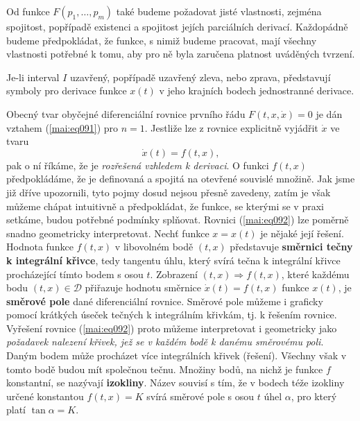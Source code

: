   \begin{mdframed}[style=mdnote]     
    Od funkce \(F(p_1, \ldots, p_m)\) také budeme požadovat jisté vlastnosti, zejména spojitost,
    popřípadě existenci a spojitost jejích parciálních derivací. Každopádně budeme předpokládat, že
    funkce, s nimiž budeme pracovat, mají všechny vlastnosti potřebné k tomu, aby pro ně byla
    zaručena platnost uváděných tvrzení.
  \end{mdframed}

  \begin{mdframed}[style=mdnote]     
    Je-li interval \(I\) uzavřený, popřípadě uzavřený zleva, nebo zprava, představují symboly pro
    derivace funkce \(x(t)\) v jeho krajních bodech jednostranné derivace.
  \end{mdframed}
        
    Obecný tvar obyčejné diferenciální rovnice prvního řádu \(F(t, x, \dot{x}) = 0\) je dán vztahem
    (\ref{mai:eq091}) pro \(n = 1\). Jestliže lze z rovnice explicitně vyjádřit \(\dot{x}\) ve tvaru
    \begin{equation}\label{mai:eq092}
      \dot{x}(t) = f(t, x),
    \end{equation}
    pak o ní říkáme, že je \emph{rozřešená vzhledem k derivaci}. O funkci \(f(t, x)\) předpokládáme,
    že je definovaná a spojitá na otevřené souvislé množině. Jak jsme již dříve upozornili, tyto
    pojmy dosud nejsou přesně zavedeny, zatím je však můžeme chápat intuitivně a předpokládat, že
    funkce, se kterými se v praxi setkáme, budou potřebné podmínky splňovat. Rovnici
    (\ref{mai:eq092}) lze poměrně snadno geometricky interpretovat. Nechť funkce \(x = x(t)\) je
    nějaké její řešení. Hodnota funkce \(f(t, x)\) v libovolném bodě \((t, x)\) představuje
    \textbf{směrnici tečny k integrální křivce}, tedy tangentu úhlu, který svírá tečna k integrální
    křivce procházející tímto bodem s osou \(t\). Zobrazení \((t, x) \Rightarrow f(t, x)\), které
    každému bodu \((t, x) \in \mathcal{D}\) přiřazuje hodnotu směrnice \(\dot{x}(t) = f(t, x)\)
    funkce \(x(t)\), je \textbf{směrové pole} dané diferenciální rovnice. Směrové pole můžeme i
    graficky  pomocí krátkých úseček tečných k integrálním křivkám, tj. k řešením
    rovnice. Vyřešení rovnice (\ref{mai:eq092}) proto můžeme interpretovat i geometricky jako
    \emph{požadavek nalezení křivek, jež se v každém bodě  k danému směrovému poli}.
    Daným bodem může procházet více integrálních křivek (řešení). Všechny však v tomto bodě budou
    mít společnou tečnu. Množiny bodů, na nichž je funkce \(f\) konstantní, se nazývají
    \textbf{izokliny}. Název souvisí s tím, že v bodech téže izokliny určené konstantou \(f(t, x) =
    K\) svírá směrové pole s osou \(t\) úhel \(\alpha\), pro který platí \(\tan\alpha = K\). 

